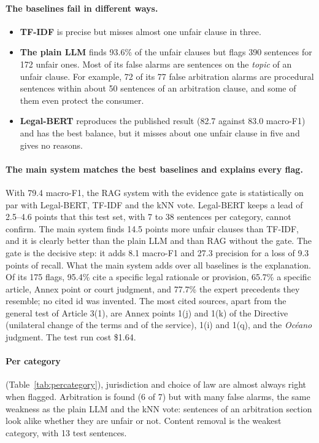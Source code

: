 \paragraph{The baselines fail in different ways.}
\begin{itemize}
  \item \textbf{TF-IDF} is precise but misses almost one unfair clause in three.
  \item \textbf{The plain LLM} finds 93.6\% of the unfair clauses but flags 390 sentences for 172 unfair ones. Most of its false alarms are sentences on the \emph{topic} of an unfair clause. For example, 72 of its 77 false arbitration alarms are procedural sentences within about 50 sentences of an arbitration clause, and some of them even protect the consumer.
  \item \textbf{Legal-BERT} reproduces the published result (82.7 against 83.0 macro-F1) and has the best balance, but it misses about one unfair clause in five and gives no reasons.
\end{itemize}

\paragraph{The main system matches the best baselines and explains every flag.} With 79.4 macro-F1, the RAG system with the evidence gate is statistically on par with Legal-BERT, TF-IDF and the kNN vote. Legal-BERT keeps a lead of 2.5--4.6 points that this test set, with 7 to 38 sentences per category, cannot confirm. The main system finds 14.5 points more unfair clauses than TF-IDF, and it is clearly better than the plain LLM and than RAG without the gate. The gate is the decisive step: it adds 8.1 macro-F1 and 27.3 precision for a loss of 9.3 points of recall. What the main system adds over all baselines is the explanation. Of its 175 flags, 95.4\% cite a specific legal rationale or provision, 65.7\% a specific article, Annex point or court judgment, and 77.7\% the expert precedents they resemble; no cited id was invented. The most cited sources, apart from the general test of Article 3(1), are Annex points 1(j) and 1(k) of the Directive (unilateral change of the terms and of the service), 1(i) and 1(q), and the \emph{Oc\'eano} judgment. The test run cost \$1.64.

\paragraph{Per category} (Table~\ref{tab:percategory}), jurisdiction and choice of law are almost always right when flagged. Arbitration is found (6 of 7) but with many false alarms, the same weakness as the plain LLM and the kNN vote: sentences of an arbitration section look alike whether they are unfair or not. Content removal is the weakest category, with 13 test sentences.


